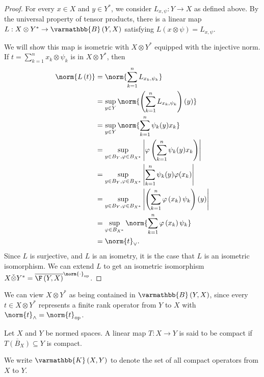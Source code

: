 \documentclass[10pt]{mypackage}
\renewcommand*{\mathbb}[1]{\varmathbb{#1}}
\newcommand{\K}{\mathbb{K}}
\newcommand{\B}{\mathbb{B}}
\begin{document}
\begin{proof}
  For every $x\in X$ and $y\in Y^{\ast}$, we consider $L_{x,\psi}: Y\rightarrow X$ as defined above. By the universal property of tensor products, there is a linear map $L: X\otimes Y^{\ast}\rightarrow \B\left(Y,X\right)$ satisfying $L\left(x\otimes \psi\right) = L_{x,\psi}$.\newline

  We will show this map is isometric with $X\otimes Y^{\ast}$ equipped with the injective norm. If $t = \sum_{k=1}^{n}x_k\otimes \psi_k$ is in $X\otimes Y^{\ast}$, then
  \begin{align*}
    \norm{L\left(t\right)} &= \norm{\sum_{k=1}^{n}L_{x_k,\psi_k}}\\
                           &= \sup_{y\in Y}\norm{\left(\sum_{k=1}^{n}L_{x_k,\psi_k}\right)\left(y\right)}\\
                           &= \sup_{y\in Y}\norm{\sum_{k=1}^{n}\psi_k(y)x_k}\\
                           &= \sup_{y\in B_Y,\varphi\in B_{X^{\ast}}}\left\vert \varphi\left(\sum_{k=1}^{n}\psi_k(y)x_k\right) \right\vert\\
                           &= \sup_{y\in B_Y,\varphi\in B_{X^{\ast}}}\left\vert \sum_{k=1}^{n}\psi_k(y)\varphi(x_k) \right\vert\\
                           &= \sup_{y\in B_Y,\varphi\in B_{X^{\ast}}}\left\vert \left(\sum_{k=1}^{n}\varphi\left(x_k\right)\psi_k\right)(y) \right\vert\\
                           &= \sup_{\varphi\in B_{X^{\ast}}}\norm{\sum_{k=1}^{n}\varphi\left(x_k\right)\psi_k}\\
                           &= \norm{t}_{\vee}.
  \end{align*}
  Since $L$ is surjective, and $L$ is an isometry, it is the case that $L$ is an isometric isomorphism. We can extend $L$ to get an isometric isomorphism $X\check\otimes Y^{\ast} = \overline{\F\left(Y,X\right)}^{\norm{\cdot}_{\text{op}}}$.
\end{proof}
\begin{remark}
  We can view $X\otimes Y^{\ast}$ as being contained in $\B\left(Y,X\right)$, since every $t\in X\otimes Y^{\ast}$ represents a finite rank operator from $Y$ to $X$ with $\norm{t}_{\wedge} = \norm{t}_{\text{op}}$.
\end{remark}
\begin{definition}
  Let $X$ and $Y$ be normed spaces. A linear map $T: X\rightarrow Y$ is said to be compact if $\overline{T\left(B_X\right)}\subseteq Y$ is compact.\newline

  We write $\K\left(X,Y\right)$ to denote the set of all compact operators from $X$ to $Y$.
\end{definition}
\end{document}
